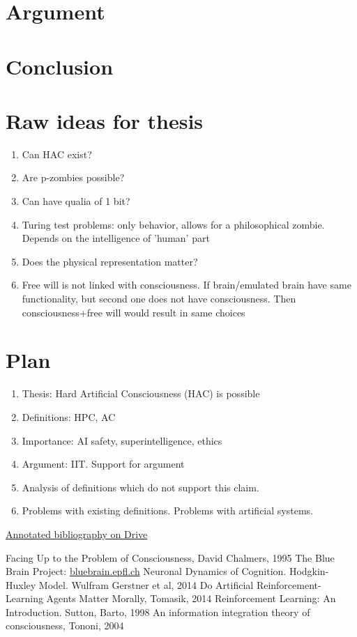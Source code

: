 \documentclass[a4paper, 12pt]{article}
\begin{document}


\section{Argument}
\section{Conclusion}
\section{Raw ideas for thesis}
\begin{enumerate}
	\item Can HAC exist?
	\item Are p-zombies possible?
	\item Can have qualia of 1 bit?
	\item Turing test problems: only behavior, allows for a philosophical zombie. Depends on the intelligence of 'human' part
	\item Does the physical representation matter?
	\item Free will is not linked with consciousness. If brain/emulated brain have same functionality, but second one does not have consciousness. Then consciousness+free will would result in same choices
\end{enumerate}
\section{Plan}
\begin{enumerate}
	\item Thesis: Hard Artificial Consciousness (HAC) is possible
	\item Definitions: HPC, AC
	\item Importance: AI safety, superintelligence, ethics
	\item Argument: IIT. Support for argument
	\item Analysis of definitions which do not support this claim.
	\item Problems with existing definitions. Problems with artificial systems.
\end{enumerate}

\href{https://docs.google.com/document/d/1kh4wC9YHNJEcCBxE1eaymw9PPa1VdCW25BH0GEIQgj4/edit#heading=h.ptmcnj925n6h}{Annotated bibliography on Drive}
\begin{thebibliography}{20}
 Facing Up to the Problem of Consciousness, David Chalmers, 1995
 The Blue Brain Project: \href{https://bluebrain.epfl.ch/}{bluebrain.epfl.ch}
 Neuronal Dynamics of Cognition. Hodgkin-Huxley Model. Wulfram Gerstner et al, 2014
 Do Artificial Reinforcement-Learning Agents Matter Morally, Tomasik, 2014
 Reinforcement Learning: An Introduction. Sutton, Barto, 1998
 An information integration theory of consciousness, Tononi, 2004
\end{thebibliography}
\end{document}
